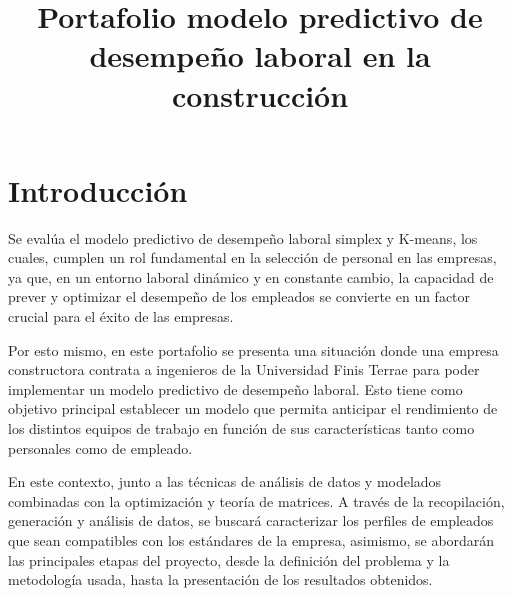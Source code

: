 \documentclass{plantillauft}
\title{Portafolio modelo predictivo de desempeño laboral en la construcción} %
\begin{document}


\fairemarges 
\portada
\tableofcontents 

\newpage

\section{Introducción}
Se evalúa el modelo predictivo de desempeño laboral simplex y K-means, los cuales, cumplen un rol fundamental en la selección de personal en las empresas, ya que, en un entorno laboral dinámico y en constante cambio, la capacidad de prever y optimizar el desempeño de los empleados se convierte en un factor crucial para el éxito de las empresas.
\newline

Por esto mismo, en este portafolio se presenta una situación donde una empresa constructora contrata a ingenieros de la Universidad Finis Terrae para poder implementar un modelo predictivo de desempeño laboral. Esto tiene como objetivo principal establecer un modelo que permita anticipar el rendimiento de los distintos equipos de trabajo en función de sus características tanto como personales como de empleado.
\newline

En este contexto, junto a las técnicas de análisis de datos y modelados combinadas con la optimización y teoría de matrices. A través de la recopilación, generación y análisis de datos, se buscará caracterizar los perfiles de empleados que sean compatibles con los estándares de la empresa, asimismo, se abordarán las principales etapas del proyecto, desde la definición del problema y la metodología usada, hasta la presentación de los resultados obtenidos.
\newpage
\end{document}
